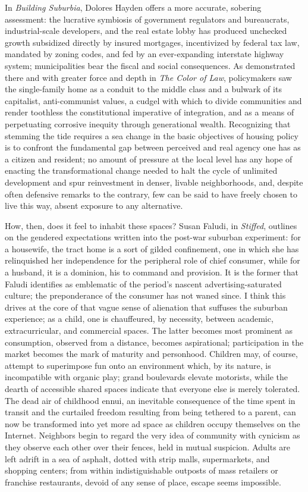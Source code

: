\documentclass[oneside, a5paper]{book}
\begin{document}
In \textit{Building Suburbia}, Dolores Hayden offers a more accurate, sobering assessment: the lucrative symbiosis of government regulators and bureaucrats, industrial-scale developers, and the real estate lobby has produced unchecked growth subsidized directly by insured mortgages, incentivized by federal tax law, mandated by zoning codes, and fed by an ever-expanding interstate highway system; municipalities bear the fiscal and social consequences. As demonstrated there and with greater force and depth in \textit{The Color of Law}, policymakers saw the single-family home as a conduit to the middle class and a bulwark of its capitalist, anti-communist values, a cudgel with which to divide communities and render toothless the constitutional imperative of integration, and as a means of perpetuating corrosive inequity through generational wealth. Recognizing that stemming the tide requires a sea change in the basic objectives of housing policy is to confront the fundamental gap between perceived and real agency one has as a citizen and resident; no amount of pressure at the local level has any hope of enacting the transformational change needed to halt the cycle of unlimited development and spur reinvestment in denser, livable neighborhoods, and, despite often defensive remarks to the contrary, few can be said to have freely chosen to live this way, absent exposure to any alternative.

How, then, does it feel to inhabit these spaces? Susan Faludi, in \textit{Stiffed}, outlines on the gendered expectations written into the post-war suburban experiment: for a housewife, the tract home is a sort of gilded confinement, one in which she has relinquished her independence for the peripheral role of chief consumer, while for a husband, it is a dominion, his to command and provision. It is the former that Faludi identifies as emblematic of the period's nascent advertising-saturated culture; the preponderance of the consumer has not waned since. I think this drives at the core of that vague sense of alienation that suffuses the suburban experience; as a child, one is chauffeured, by necessity, between academic, extracurricular, and commercial spaces. The latter becomes most prominent as consumption, observed from a distance, becomes aspirational; participation in the market becomes the mark of maturity and personhood. Children may, of course, attempt to superimpose fun onto an environment which, by its nature, is incompatible with organic play; grand boulevards elevate motorists, while the dearth of accessible shared spaces indicate that everyone else is merely tolerated. The dead air of childhood ennui, an inevitable consequence of the time spent in transit and the curtailed freedom resulting from being tethered to a parent, can now be transformed into yet more ad space as children occupy themselves on the Internet. Neighbors begin to regard the very idea of community with cynicism as they observe each other over their fences, held in mutual suspicion. Adults are left adrift in a sea of asphalt, dotted with strip malls, supermarkets, and shopping centers; from within indistiguishable outposts of mass retailers or franchise restaurants, devoid of any sense of place, escape seems impossible.
\end{document}
